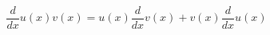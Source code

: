 \documentclass[preview]{standalone}
\begin{document}
\begin{align*}
\dfrac{d}{dx}u(x)v(x) = u(x)\dfrac{d}{dx}v(x) + v(x)\dfrac{d}{dx}u(x)
\end{align*}
\end{document}

